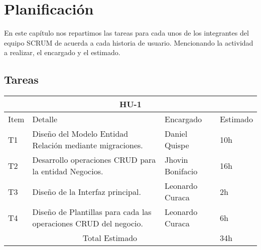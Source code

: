 \chapter{Planificación}
En este capítulo nos repartimos las tareas para cada unos de los integrantes del equipo SCRUM de acuerda a cada historia de usuario. Mencionando la actividad a realizar, el encargado y el estimado.

\section{Tareas}
\begin{table}[htbp]
	\begin{center}
		\begin{tabular}{| p{0.7cm} | p{10cm} | p{3.2cm} | p{1.8cm}|}
			\hline
			\multicolumn{4}{|c|}{HU-1}\\
			\hline
			Item & Detalle & Encargado & Estimado \\
			\hline
			T1 & Diseño del Modelo Entidad Relación mediante migraciones. & Daniel Quispe & 10h \\
			\hline
			T2 & Desarrollo operaciones CRUD para la entidad Negocios. & Jhovin Bonifacio & 16h \\
			\hline
			T3 & Diseño de la Interfaz principal. & Leonardo Curaca & 2h \\
			\hline
			T4 & Diseño de Plantillas para cada las operaciones CRUD del negocio. & Leonardo Curaca & 6h \\
			\hline
			\multicolumn{3}{|c|}{Total Estimado} & 34h\\
			\hline
		\end{tabular}
	\end{center}
\end{table}



